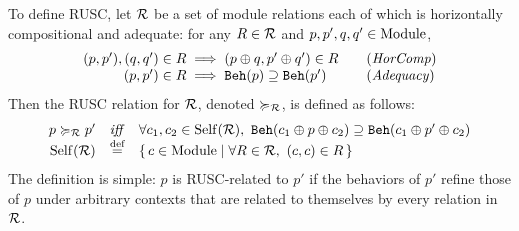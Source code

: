 To define RUSC, let $\mathcal{R}$ be a set of module relations each of which is horizontally
compositional and adequate: for any $R \in \mathcal{R}$ and $p,p',q,q'\in \textrm{Module}$,
\[
\begin{array}{r@{}l@{\qquad}l}
(p,p'),(q,q')\in R &{}\implies (p \llink q, p' \llink q') \in R &\textrm{(\emph{HorComp})} \\
(p,p') \in R &{}\implies \beh{p} \supseteq \beh{p'} &\textrm{(\emph{Adequacy})} \\
\end{array}
\]
Then the RUSC relation for $\mathcal{R}$, denoted $\succcurlyeq_{\mathcal{R}}$, is defined as follows:
\[
\begin{array}{rcl}
p \succcurlyeq_{\mathcal{R}} p' &\text{\emph{iff}}& \forall c_1, c_2 \in \mathrm{Self}(\mathcal{R}),~
\mathtt{Beh}({c_{1} \oplus p  \oplus c_2}) \supseteq \mathtt{Beh}({c_{1} \oplus p' \oplus c_2}) \\
\mathrm{Self}(\mathcal{R}) & \stackrel{\text{def}}{=} & \{\,  c \in \textrm{Module} \;|\; \forall R \in \mathcal{R},~ (c,c) \in R  \,\}
\end{array}
\]
The definition is simple: $p$ is RUSC-related to $p'$ if the behaviors of $p'$ refine those of $p$ under
arbitrary contexts that are related to themselves by every relation in $\mathcal{R}$.

